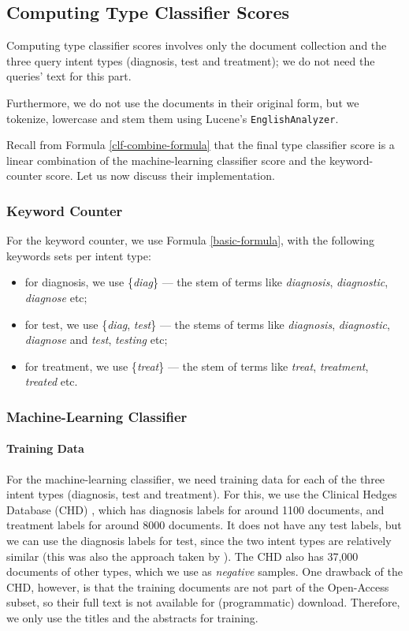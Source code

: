 \subsection{Computing Type Classifier Scores}
Computing type classifier scores involves only the document collection and the three query intent types (diagnosis, test and treatment);
we do not need the queries' text for this part.

Furthermore, we do not use the documents in their original form,
but we tokenize, lowercase and stem them using Lucene's \texttt{EnglishAnalyzer}.

Recall from Formula \ref{clf-combine-formula} that the final type classifier score is a linear combination of the
machine-learning classifier score and the keyword-counter score. Let us now discuss their implementation.

\subsubsection{Keyword Counter}
For the keyword counter, we use Formula \ref{basic-formula}, with the following keywords sets per intent type:
\begin{itemize}
 \item for diagnosis, we use \{\emph{diag}\} --- the stem of terms like \emph{diagnosis}, \emph{diagnostic}, \emph{diagnose} etc;
 \item for test, we use \{\emph{diag}, \emph{test}\} --- the stems of terms like \emph{diagnosis}, \emph{diagnostic}, \emph{diagnose} and
 \emph{test}, \emph{testing} etc;
 \item for treatment, we use \{\emph{treat}\} --- the stem of terms like \emph{treat}, \emph{treatment}, \emph{treated} etc.
\end{itemize}

\subsubsection{Machine-Learning Classifier}
\paragraph{Training Data}
For the machine-learning classifier, we need training data for each of the three intent types (diagnosis, test and treatment).
For this, we use the Clinical Hedges Database (CHD)
\cite{chd},
which has diagnosis labels for around 1100 documents, and treatment labels for around 8000 documents. It does
not have any test labels, but we can use the diagnosis labels for test, since the two intent types are relatively similar
(this was also the approach taken by \cite{choi}).
The CHD also has 37,000 documents of other types, which we use as \emph{negative} samples.
One drawback of the CHD, however, is that the training documents are not part of the Open-Access subset, so their full text is not
available for (programmatic) download. Therefore, we only use the titles and the abstracts for training.

